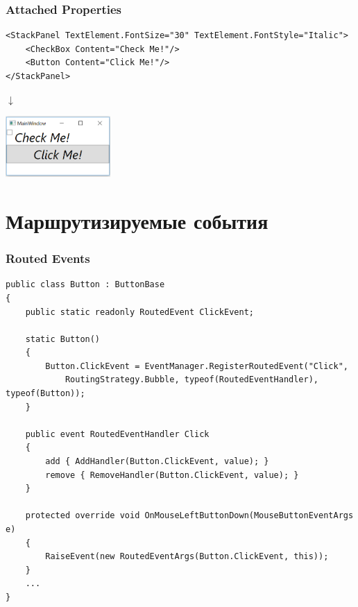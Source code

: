 \documentclass[xetex,mathserif,serif]{beamer}
\begin{document}
	\begin{frame}[fragile]
		\frametitle{Attached Properties}
		\begin{small}
			\begin{verbatim}
<StackPanel TextElement.FontSize="30" TextElement.FontStyle="Italic">
    <CheckBox Content="Check Me!"/>
    <Button Content="Click Me!"/>
</StackPanel>
			\end{verbatim}
		\end{small}
		\begin{center}\begin{LARGE}$\downarrow$\end{LARGE}\end{center}
		\begin{center}
			\includegraphics[width=0.3\textwidth]{fancyWindow.png}
		\end{center}
	\end{frame}

	\section{Маршрутизируемые события}
	
	\begin{frame}[fragile]
		\frametitle{Routed Events}
		\begin{scriptsize}
			\begin{verbatim}
public class Button : ButtonBase
{
    public static readonly RoutedEvent ClickEvent;

    static Button()
    {
        Button.ClickEvent = EventManager.RegisterRoutedEvent("Click",
            RoutingStrategy.Bubble, typeof(RoutedEventHandler), typeof(Button));
    }

    public event RoutedEventHandler Click
    {
        add { AddHandler(Button.ClickEvent, value); }
        remove { RemoveHandler(Button.ClickEvent, value); }
    }

    protected override void OnMouseLeftButtonDown(MouseButtonEventArgs e)
    {
        RaiseEvent(new RoutedEventArgs(Button.ClickEvent, this));
    }
    ...
}
			\end{verbatim}
		\end{scriptsize}
	\end{frame}
\end{document}

